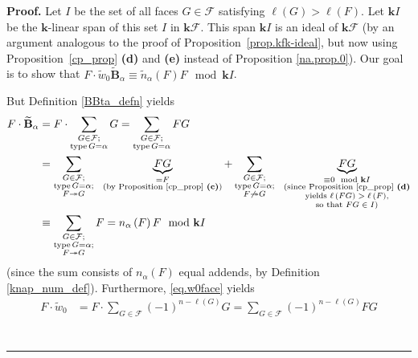 \documentclass[12pt]{article}
\theoremstyle{definition}%
\theoremstyle{definition}%
\theoremstyle{remark}%
\newcommand{\tup}[1]{\left( #1 \right)}
\newcommand{\kk}{\mathbf{k}}
\newcommand{\kf}{\kk\mathcal{F}}
\newcommand{\BBta}{\widetilde{\mathbf{B}}_{\alpha}}
\newcommand{\CF}{\mathcal{F}}
\newcommand{\wotil}{\widetilde{w}_0}
\newcommand{\na}{n_{ \alpha } }%
\newcommand{\nna}{\widetilde{n}_{ \alpha } }%
\newcommand{\type}{\operatorname{type}}
\newcommand{\con}{\twoheadrightarrow} %
\newenvironment{proof}[1][Proof]{\noindent\textbf{#1.} }{\ \rule{0.5em}{0.5em}}
\begin{document}
\begin{proof}
    Let $I$ be the set of all faces $G \in \CF$ satisfying $\ell\tup{ G } > \ell\tup{ F } $.
	Let $\kk I$ be the $\kk$-linear span of this set $I$ in $\kf$.
	This span $\kk I$ is an ideal of $\kf$ (by an argument analogous to the proof of Proposition~\ref{prop.kfk-ideal}, but now using Proposition~\ref{cp_prop} \textbf{(d)} and \textbf{(e)} instead of Proposition \ref{na.prop.0}).
	Our goal is to show that
	$F\cdot \wotil\BBta \equiv  \nna \tup{F}F \mod \kk I$.

	But Definition \ref{BBta_defn} yields
    \begin{align}
           F \cdot \BBta &= F \cdot \sum_{\substack{G \in \CF; \\ \type G = \alpha}} G
		   = \sum_{\substack{G \in \CF; \\ \type G = \alpha}} FG \nonumber\\
           &= \sum_{\substack{G \in \CF; \\ \type G = \alpha; \\ F \con G}} \ \ \underbrace{FG}_{\substack{= F \\ \text{(by Proposition \ref{cp_prop} \textbf{(c)})}}}
		   + \sum_{\substack{G \in \CF; \\ \type G = \alpha; \\ F \not\con G}} \ \ \underbrace{FG}_{\substack{\equiv 0 \mod \kk I \\ \text{(since Proposition \ref{cp_prop} \textbf{(d)}} \\ \text{yields $\ell\tup{FG} > \ell\tup{F}$,} \\ \text{so that $FG \in I$)}}} \nonumber\\
           &\equiv \sum_{\substack{G \in \CF; \\ \type G = \alpha; \\ F \con G}} F
		   = \na\tup{F} F \mod \kk I
		   \label{pf.mblks_lem.1}
    \end{align}
	(since the sum consists of $\na\tup{F}$ equal addends, by Definition \ref{knap_num_def}).
    Furthermore, \eqref{eq.w0face} yields
    \begin{align*}
           F \cdot \wotil &= F \cdot \sum_{G \in \CF} \tup{ -1 }^{n-\ell\tup{ G }}G
		   = \sum_{G \in \CF} \tup{ -1 }^{n-\ell\tup{ G }} FG 		   \\

\end{align*}
\end{proof}
\end{document}
